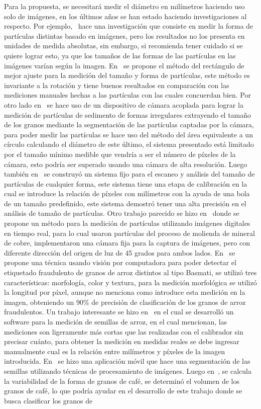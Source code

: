 Para la propuesta, se necesitará medir el diámetro en milímetros haciendo uso solo de imágenes, en los últimos años se han estado haciendo investigaciones al respecto. Por ejemplo,~\citep{Carter2005} hace una investigación que consiste en medir la forma de partículas distintas basado en imágenes, pero los resultados no los presenta en unidades de medida absolutas, sin embargo, si recomienda tener cuidado si se quiere lograr esto, ya que los tamaños de las formas de las partículas en las imágenes varían según la imagen. En~\citep{Wang2006} se propone el método del rectángulo de mejor ajuste para la medición del tamaño y forma de partículas, este método es invariante a la rotación y tiene buenos resultados en comparación con las mediciones manuales hechas a las partículas con las cuales concuerdan bien. Por otro lado en~\citep{Hong2013} se hace uso de un dispositivo de cámara acoplada para lograr la medición de partículas de sedimento de formas irregulares extrayendo el tamaño de los granos mediante la segmentación de las partículas captadas por la cámara, para poder medir las  partículas se hace uso del método del área equivalente a un círculo calculando el diámetro de este último, el sistema presentado está limitado por el tamaño mínimo medible que vendría a ser el número de píxeles de la cámara, esto podría ser superado usando una cámara de alta resolución. Luego también en~\citep{Liao2010} se construyó un sistema fijo para el escaneo y análisis del tamaño de partículas de cualquier forma, este sistema tiene una etapa de calibración en la cual se introduce la relación de píxeles con milímetros con la ayuda de una bola de un tamaño predefinido, este sistema demostró tener una alta precisión en el análisis de tamaño de partículas. Otro trabajo parecido se hizo en~\citep{Budzan2018} donde se propone un método para la medición de partículas utilizando imágenes digitales en tiempo real, para lo cual usaron partículas del proceso de molienda de mineral de cobre, implementaron una cámara fija para la captura de imágenes, pero con diferente dirección del origen de luz de 45 grados para ambos lados. En~\citep{Ali2017} se propone una técnica usando visión por computadora para poder detectar el etiquetado fraudulento de granos de arroz distintos al tipo Basmati, se utilizó tres características: morfología, color y textura, para la medición morfológica se utilizó la longitud por píxel, aunque no menciona como introduce esta medición en la imagen, obteniendo un 90\% de precisión de clasificación de los granos de arroz fraudulentos. Un trabajo interesante se hizo en~\citep{Tanabata2012} en el cual se desarrolló un software para la medición de semillas de arroz, en el cual mencionan, las mediciones son ligeramente más cortas que las realizadas con el calibrador sin precisar cuánto, para obtener la medición en medidas reales se debe ingresar manualmente cual es la relación entre milímetros y píxeles de la imagen introducida. En~\citep{Gao2017} se hizo una aplicación móvil que hace una segmentación de las semillas utilizando técnicas de procesamiento de imágenes. Luego en~\citep{Severa2012}, se calcula la variabilidad de la forma de granos de café, se determinó el volumen de los granos de café, lo que podría ayudar en el desarrollo de este trabajo donde se busca clasificar los granos de 